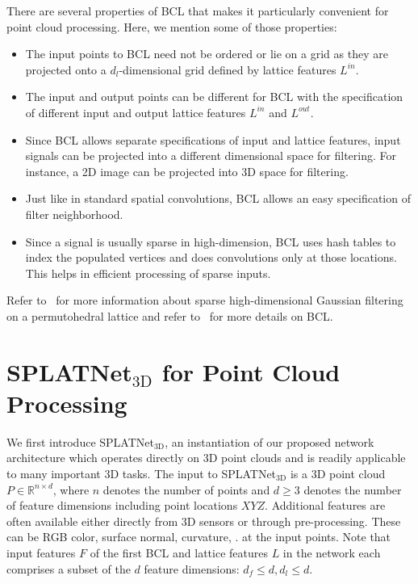 \documentclass[10pt,twocolumn,letterpaper]{article}
\newcommand{\camreadycomment}[1]{{\textcolor{red}{#1}}}
\begin{document}
There are several properties of BCL that makes it particularly convenient for point cloud
processing. Here, we mention some of those properties:
\vspace{-1mm}\begin{itemize}
    \setlength\itemsep{0mm}
    \item The input points to BCL need not be ordered or lie on a grid as
    they are projected onto a $d_l$-dimensional grid defined by lattice features $L^{in}$.
    \item The input and output points can be different for BCL with 
    the specification of different input and output lattice features $L^{in}$ and $L^{out}$.
    \item Since BCL allows separate specifications of input and lattice
    features, input signals can be projected into a different dimensional space for filtering.
    For instance, a 2D image can be projected into 3D space for filtering.
    \item Just like in standard spatial convolutions, BCL allows an easy specification
    of filter neighborhood. 
    \item Since a signal is usually sparse in high-dimension, BCL uses
    hash tables to index the populated vertices and does convolutions only at those locations.
    This helps in efficient processing of sparse inputs.
\end{itemize}\vspace{-1mm}

Refer to~\cite{adams2010fast} for more information about sparse high-dimensional Gaussian filtering
on a permutohedral lattice and refer to~\cite{jampani2016learning} for more details on BCL.


\section{SPLATNet$_{\text{3D}}$ for Point Cloud Processing}\label{sec:bpcn_3d}We first introduce SPLATNet$_{\text{3D}}$, an instantiation of our proposed network architecture which operates directly on 3D point clouds and is readily applicable to many important 3D tasks. 
The input to SPLATNet$_{\text{3D}}$ is a 3D point cloud $P \in \mathbb{R}^{n \times d}$, where $n$ denotes the number of points and $d \ge 3$ denotes the number of feature dimensions including point locations $XYZ$. 
Additional features are often available either directly from 3D sensors 
or through pre-processing. These can be RGB color, surface normal, curvature, \etc. at the input points.
Note that input features $F$ of the first BCL and lattice features $L$ in the network each 
comprises a subset of the $d$ feature dimensions: $d_f\le d, d_l \le d$.
\end{document}
